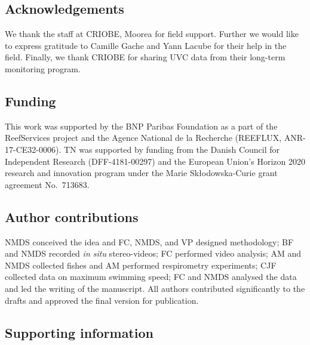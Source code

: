 \documentclass[
]{article}
\begin{document}
\hypertarget{acknowledgements}{%
\subsection{Acknowledgements}\label{acknowledgements}}

We thank the staff at CRIOBE, Moorea for field support. Further we would
like to express gratitude to Camille Gache and Yann Lacube for their
help in the field. Finally, we thank CRIOBE for sharing UVC data from
their long-term monitoring program.

\hypertarget{funding}{%
\subsection{Funding}\label{funding}}

This work was supported by the BNP Paribas Foundation as a part of the
ReefServices project and the Agence National de la Recherche (REEFLUX,
ANR-17-CE32-0006). TN was supported by funding from the Danish Council
for Independent Research (DFF-4181-00297) and the European Union's
Horizon 2020 research and innovation program under the Marie
Skłodowska-Curie grant agreement No.~713683.

\hypertarget{author-contributions}{%
\subsection{Author contributions}\label{author-contributions}}

NMDS conceived the idea and FC, NMDS, and VP designed methodology; BF
and NMDS recorded \emph{in situ} stereo-videos; FC performed video
analysis; AM and NMDS collected fishes and AM performed respirometry
experiments; CJF collected data on maximum swimming speed; FC and NMDS
analysed the data and led the writing of the manuscript. All authors
contributed significantly to the drafts and approved the final version
for publication.

\hypertarget{supporting-information}{%
\subsection{Supporting information}\label{supporting-information}}
\end{document}
